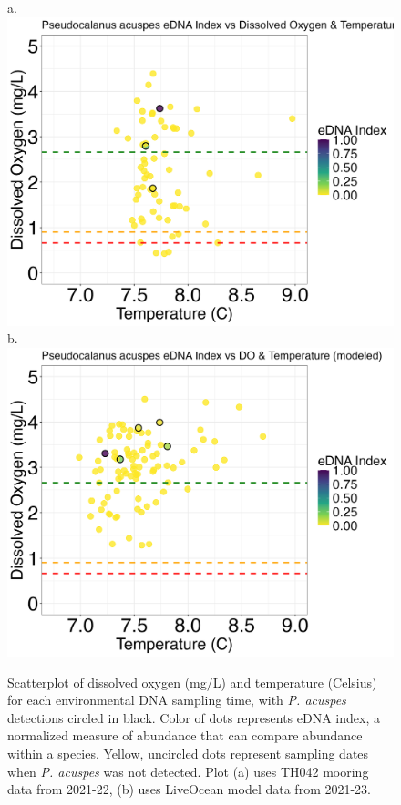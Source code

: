 \documentclass[12pt,twoside]{reedthesis}
\begin{document}
	\begin{figure}[!h]
		\begin{center}
			a. \includegraphics[scale=0.3]{Pacuspes_Scatter_noOut}
			b. \includegraphics[scale=0.3]{Pacuspes_Scatter_AllYr_mod_noOut}
			\caption[\textit{P. acuspes} scatterplot]{\footnotesize{Scatterplot of dissolved oxygen (mg/L) and temperature (Celsius) for each environmental DNA sampling time, with \textit{P. acuspes} detections circled in black. Color of dots represents eDNA index, a normalized measure of abundance that can compare abundance within a species. Yellow, uncircled dots represent sampling dates when \textit{P. acuspes} was not detected. Plot (a) uses TH042 mooring data from 2021-22, (b) uses LiveOcean model data from 2021-23.}} %
				\label{PacuspesScatter}
		\end{center}
	\end{figure} 
	
\end{document}
